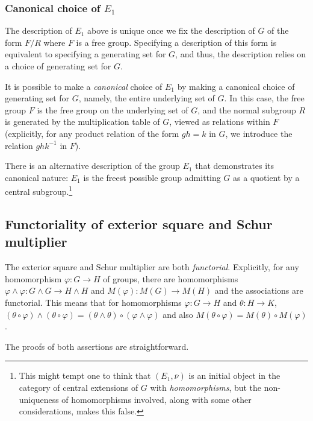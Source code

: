 \documentclass{ucetd}
\begin{document}
\subsubsection{Canonical choice of $E_1$}

The description of $E_1$ above is unique once we fix the description
of $G$ of the form $F/R$ where $F$ is a free group. Specifying a
description of this form is equivalent to specifying a generating set
for $G$, and thus, the description relies on a choice of generating
set for $G$.

It is possible to make a {\em canonical} choice of $E_1$ by making a
canonical choice of generating set for $G$, namely, the entire
underlying set of $G$. In this case, the free group $F$ is the free
group on the underlying set of $G$, and the normal subgroup $R$ is
generated by the multiplication table of $G$, viewed as relations
within $F$ (explicitly, for any product relation of the form $gh = k$
in $G$, we introduce the relation $ghk^{-1}$ in $F$).

There is an alternative description of the group $E_1$ that
demonstrates its canonical nature: $E_1$ is the freest possible group
admitting $G$ as a quotient by a central subgroup.\footnote{This might
  tempt one to think that $(E_1,\overline{\nu})$ is an initial object
  in the category of central extensions of $G$ with {\em
    homomorphisms}, but the non-uniqueness of homomorphisms involved,
  along with some other considerations, makes this false.}

\subsection{Functoriality of exterior square and Schur multiplier}\label{sec:functoriality}

The exterior square and Schur multiplier are both {\em
  functorial}. Explicitly, for any homomorphism $\varphi:G \to H$ of
groups, there are homomorphisms $\varphi \wedge \varphi: G \wedge G
\to H \wedge H$ and $M(\varphi): M(G) \to M(H)$ and the associations
are functorial. This means that for homomorphisms $\varphi:G \to H$
and $\theta: H \to K$, $(\theta \circ \varphi) \wedge (\theta \circ
\varphi) = (\theta \wedge \theta) \circ (\varphi \wedge \varphi)$ and
also $M(\theta \circ \varphi) = M(\theta) \circ M(\varphi)$.

The proofs of both assertions are straightforward. %
\end{document}
